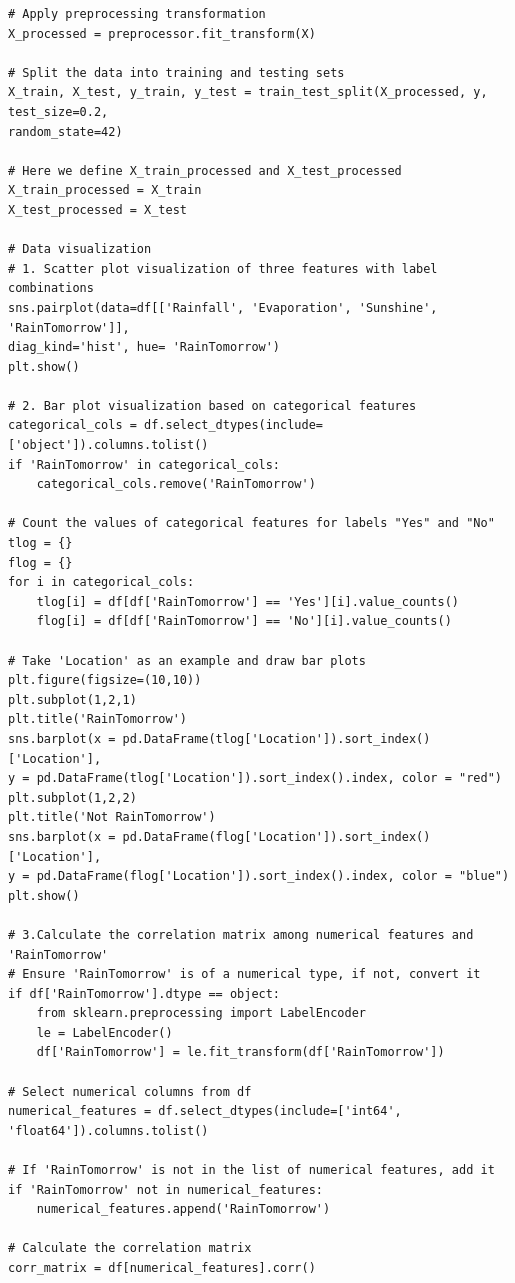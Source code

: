 \documentclass[12pt]{article}
\begin{document}
\begin{verbatim}
# Apply preprocessing transformation
X_processed = preprocessor.fit_transform(X)

# Split the data into training and testing sets
X_train, X_test, y_train, y_test = train_test_split(X_processed, y, test_size=0.2, 
random_state=42)

# Here we define X_train_processed and X_test_processed
X_train_processed = X_train
X_test_processed = X_test

# Data visualization
# 1. Scatter plot visualization of three features with label combinations
sns.pairplot(data=df[['Rainfall', 'Evaporation', 'Sunshine', 'RainTomorrow']],
diag_kind='hist', hue= 'RainTomorrow')
plt.show()

# 2. Bar plot visualization based on categorical features
categorical_cols = df.select_dtypes(include=['object']).columns.tolist()
if 'RainTomorrow' in categorical_cols:
    categorical_cols.remove('RainTomorrow')

# Count the values of categorical features for labels "Yes" and "No"
tlog = {}
flog = {}
for i in categorical_cols:
    tlog[i] = df[df['RainTomorrow'] == 'Yes'][i].value_counts()
    flog[i] = df[df['RainTomorrow'] == 'No'][i].value_counts()

# Take 'Location' as an example and draw bar plots
plt.figure(figsize=(10,10))
plt.subplot(1,2,1)
plt.title('RainTomorrow')
sns.barplot(x = pd.DataFrame(tlog['Location']).sort_index()['Location'], 
y = pd.DataFrame(tlog['Location']).sort_index().index, color = "red")
plt.subplot(1,2,2)
plt.title('Not RainTomorrow')
sns.barplot(x = pd.DataFrame(flog['Location']).sort_index()['Location'], 
y = pd.DataFrame(flog['Location']).sort_index().index, color = "blue")
plt.show()

# 3.Calculate the correlation matrix among numerical features and 'RainTomorrow'
# Ensure 'RainTomorrow' is of a numerical type, if not, convert it
if df['RainTomorrow'].dtype == object:
    from sklearn.preprocessing import LabelEncoder
    le = LabelEncoder()
    df['RainTomorrow'] = le.fit_transform(df['RainTomorrow'])

# Select numerical columns from df
numerical_features = df.select_dtypes(include=['int64', 'float64']).columns.tolist()

# If 'RainTomorrow' is not in the list of numerical features, add it
if 'RainTomorrow' not in numerical_features:
    numerical_features.append('RainTomorrow')

# Calculate the correlation matrix
corr_matrix = df[numerical_features].corr()


\end{verbatim}
\end{document}
